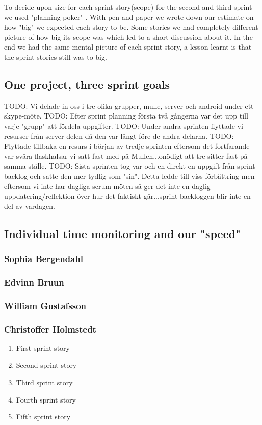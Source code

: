 To decide upon size for each sprint story(scope) for the second and third sprint we used "planning poker" \cite[p.~42]{kniberg07}.
With pen and paper we wrote down our estimate on how "big" we expected each story to be.
Some stories we had completely different picture of how big its scope was which led to a short discussion about it.
In the end we had the same mental picture of each sprint story, a lesson learnt is that the sprint stories still was to big.
%
%
\subsection{One project, three sprint goals}
TODO: Vi delade in oss i tre olika grupper, mulle, server och android under ett skype-möte.
TODO: Efter sprint planning första två gångerna var det upp till varje "grupp" att fördela uppgifter.
TODO: Under andra sprinten flyttade vi resurser från server-delen då den var långt före de andra delarna.
TODO: Flyttade tillbaka en resurs i början av tredje sprinten eftersom det fortfarande var svåra flaskhalsar vi satt fast med på Mullen...onödigt att tre sitter fast på samma ställe.
TODO: Sista sprinten tog var och en direkt en uppgift från sprint backlog och satte den mer tydlig som "sin". Detta ledde till viss förbättring men eftersom vi inte har dagliga scrum möten så ger det inte en daglig uppdatering/reflektion över hur det faktiskt går...sprint backloggen blir inte en del av vardagen.
\subsection{Individual time monitoring and our "speed"}
\subsubsection{Sophia Bergendahl}
\subsubsection{Edvinn Bruun}
\subsubsection{William Gustafsson}
\subsubsection{Christoffer Holmstedt}
\begin{enumerate}
\item First sprint story
\item Second sprint story
\item Third sprint story
\item Fourth sprint story
\item Fifth sprint story
\end{enumerate}
